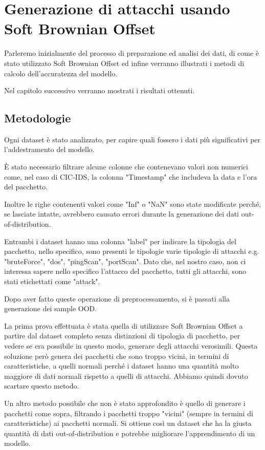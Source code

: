\chapter{Generazione di attacchi usando Soft Brownian Offset}
\label{chap:generazione_di_attacchi_usando_sbo}

Parleremo inizialmente del processo di preparazione ed analisi dei dati, di come è stato utilizzato Soft Brownian Offset ed infine verranno illustrati i metodi di calcolo dell'accuratezza del modello.

Nel capitolo successivo verranno mostrati i risultati ottenuti.


\section{Metodologie}

Ogni dataset è stato analizzato, per capire quali fossero i dati più significativi per l'addestramento del modello. 

È stato necessario filtrare alcune colonne che contenevano valori non numerici come, nel caso di CIC-IDS, la colonna "Timestamp" che includeva la data e l'ora del pacchetto. 

Inoltre le righe contenenti valori come "Inf" o "NaN" sono state modificate perché, se lasciate intatte, avrebbero causato errori durante la generazione dei dati out-of-distribution.

Entrambi i dataset hanno una colonna "label" per indicare la tipologia del pacchetto, nello specifico, sono presenti le tipologie varie tipologie di attacchi e.g. "bruteForce", "dos", "pingScan", "portScan". Dato che, nel nostro caso, non ci interessa sapere nello specifico l'attacco del pacchetto, tutti gli attacchi, sono stati etichettati come "attack".

Dopo aver fatto queste operazione di preprocessamento, si è passati alla generazione dei sample OOD.

La prima prova effettuata è stata quella di utilizzare Soft Brownian Offset a partire dal dataset completo senza distinzioni di tipologia di pacchetto, per vedere se era possibile in questo modo, generare degli attacchi verosimili. Questa soluzione però genera dei pacchetti che sono troppo vicini, in termini di caratteristiche, a quelli normali perché i dataset hanno una quantità molto maggiore di dati normali rispetto a quelli di attacchi. Abbiamo quindi dovuto scartare questo metodo.

Un altro metodo possibile che non è stato approfondito è quello di generare i pacchetti come sopra, filtrando i pacchetti troppo "vicini" (sempre in termini di caratteristiche) ai pacchetti normali. Si ottiene così un dataset che ha la giusta quantità di dati out-of-distribution e potrebbe migliorare l'apprendimento di un modello.

